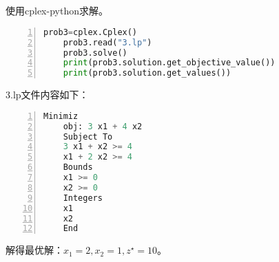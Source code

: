 \documentclass{article}
\begin{document}
\section{}
\noindent
使用cplex-python求解。\\
\begin{lstlisting}[language = python, numbers=left, 
    numberstyle=\tiny,keywordstyle=\color{blue!70},
    commentstyle=\color{red!50!green!50!blue!50},frame=shadowbox,
    rulesepcolor=\color{red!20!green!20!blue!20},basicstyle=\ttfamily]
    prob3=cplex.Cplex()
    prob3.read("3.lp")
    prob3.solve()
    print(prob3.solution.get_objective_value())
    print(prob3.solution.get_values())
\end{lstlisting}
3.lp文件内容如下：
\begin{lstlisting}[language = python, numbers=left, 
    numberstyle=\tiny,keywordstyle=\color{blue!70},
    commentstyle=\color{red!50!green!50!blue!50},frame=shadowbox,
    rulesepcolor=\color{red!20!green!20!blue!20},basicstyle=\ttfamily]
    Minimiz
    obj: 3 x1 + 4 x2
    Subject To
    3 x1 + x2 >= 4
    x1 + 2 x2 >= 4
    Bounds
    x1 >= 0
    x2 >= 0
    Integers
    x1
    x2 
    End
\end{lstlisting}
解得最优解：$x_1=2,x_2=1,z^{\star}=10$。
\end{document}
